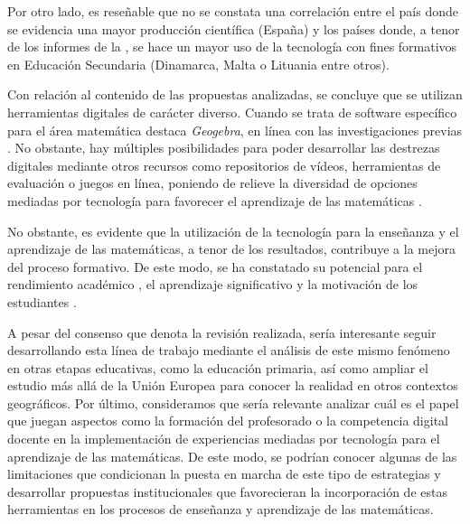 \documentclass[spanish]{textolivre}
\begin{document}
Por otro lado, es reseñable que no se constata una correlación entre el país donde se evidencia una mayor producción científica (España) y los países donde, a tenor de los informes de la \textcite{comision_2nd_2019}, se hace un mayor uso de la tecnología con fines formativos en Educación Secundaria (Dinamarca, Malta o Lituania entre otros).

Con relación al contenido de las propuestas analizadas, se concluye que se utilizan herramientas digitales de carácter diverso. Cuando se trata de software específico para el área matemática destaca \textit{Geogebra}, en línea con las investigaciones previas \cite{alabdulaziz_effectiveness_2021}. No obstante, hay múltiples posibilidades para poder desarrollar las destrezas digitales mediante otros recursos como repositorios de vídeos, herramientas de evaluación o juegos en línea, poniendo de relieve la diversidad de opciones mediadas por tecnología para favorecer el aprendizaje de las matemáticas \cite{lino__revision_2022}.

No obstante, es evidente que la utilización de la tecnología para la enseñanza y el aprendizaje de las matemáticas, a tenor de los resultados, contribuye a la mejora del proceso formativo. De este modo, se ha constatado su potencial para el rendimiento académico \cite{ardic_effect_2018,martinez-garrido_impacto_2018,zulnaidi_effect_2019}, el aprendizaje significativo \cite{birgin_effect_2020,molina__resolucion_2020,nivela__diseno_2018} y la motivación de los estudiantes \cite{fernandez-enriquez_augmented_2020,kramarenko_prospects_2019,rodriguez-cubillo_uso_2021}.

A pesar del consenso que denota la revisión realizada, sería interesante seguir desarrollando esta línea de trabajo mediante el análisis de este mismo fenómeno en otras etapas educativas, como la educación primaria, así como ampliar el estudio más allá de la Unión Europea para conocer la realidad en otros contextos geográficos. Por último, consideramos que sería relevante analizar cuál es el papel que juegan aspectos como la formación del profesorado o la competencia digital docente \cite{guillen-gamez_analysis_2021a,guillen-gamez_examining_2021b,linde-valenzuela_digital_2022} en la implementación de experiencias mediadas por tecnología para el aprendizaje de las matemáticas. De este modo, se podrían conocer algunas de las limitaciones que condicionan la puesta en marcha de este tipo de estrategias y desarrollar propuestas institucionales que favorecieran la incorporación de estas herramientas en los procesos de enseñanza y aprendizaje de las matemáticas.
\end{document}
